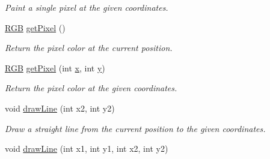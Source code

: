 \begin{DoxyCompactItemize}
\begin{DoxyCompactList}\small\item\em Paint a single pixel at the given coordinates. \end{DoxyCompactList}\item 
\hypertarget{classGUI_1_1Drawable_a1d74a05317ac725da786c76fe5788cb5}{\hyperlink{namespaceGUI_aeafd135255365f3584da0e982fc79466}{R\-G\-B} \hyperlink{classGUI_1_1Drawable_a1d74a05317ac725da786c76fe5788cb5}{get\-Pixel} ()}\label{classGUI_1_1Drawable_a1d74a05317ac725da786c76fe5788cb5}

\begin{DoxyCompactList}\small\item\em Return the pixel color at the current position. \end{DoxyCompactList}\item 
\hypertarget{classGUI_1_1Drawable_aa47df2365adb19c049cda5701b1baab9}{\hyperlink{namespaceGUI_aeafd135255365f3584da0e982fc79466}{R\-G\-B} \hyperlink{classGUI_1_1Drawable_aa47df2365adb19c049cda5701b1baab9}{get\-Pixel} (int \hyperlink{classGUI_1_1Drawable_a098294925bd310aa41080a2441790b80}{x}, int \hyperlink{classGUI_1_1Drawable_a574c99954cc268937f2c66ebe1332316}{y})}\label{classGUI_1_1Drawable_aa47df2365adb19c049cda5701b1baab9}

\begin{DoxyCompactList}\small\item\em Return the pixel color at the given coordinates. \end{DoxyCompactList}\item 
\hypertarget{classGUI_1_1Drawable_a24e229cffbe0f1763f096ce3d03016b8}{void \hyperlink{classGUI_1_1Drawable_a24e229cffbe0f1763f096ce3d03016b8}{draw\-Line} (int x2, int y2)}\label{classGUI_1_1Drawable_a24e229cffbe0f1763f096ce3d03016b8}

\begin{DoxyCompactList}\small\item\em Draw a straight line from the current position to the given coordinates. \end{DoxyCompactList}\item 
\hypertarget{classGUI_1_1Drawable_a580548bf9497c21e4591dcd12e99a8c2}{void \hyperlink{classGUI_1_1Drawable_a580548bf9497c21e4591dcd12e99a8c2}{draw\-Line} (int x1, int y1, int x2, int y2)}\label{classGUI_1_1Drawable_a580548bf9497c21e4591dcd12e99a8c2}


\end{DoxyCompactItemize}

